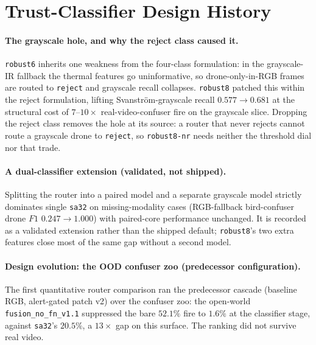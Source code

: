 \section{Trust-Classifier Design History}

\paragraph{The grayscale hole, and why the reject class caused it.}
\texttt{robust6} inherits one weakness from the four-class formulation: in the grayscale-IR fallback the thermal features go uninformative, so drone-only-in-RGB frames are routed to \texttt{reject} and grayscale recall collapses. \texttt{robust8} patched this within the reject formulation, lifting Svanstr\"om-grayscale recall $0.577 \to 0.681$ at the structural cost of $7$--$10\times$ real-video-confuser fire on the grayscale slice. Dropping the reject class removes the hole at its source: a router that never rejects cannot route a grayscale drone to \texttt{reject}, so \texttt{robust8-nr} needs neither the threshold dial nor that trade.

\paragraph{A dual-classifier extension (validated, not shipped).}
Splitting the router into a paired model and a separate grayscale model strictly dominates single \texttt{sa32} on missing-modality cases (RGB-fallback bird-confuser drone $F1$ $0.247\to1.000$) with paired-core performance unchanged. It is recorded as a validated extension rather than the shipped default; \texttt{robust8}'s two extra features close most of the same gap without a second model.

\paragraph{Design evolution: the OOD confuser zoo (predecessor configuration).}
The first quantitative router comparison ran the predecessor cascade (baseline RGB, alert-gated patch v2) over the confuser zoo: the open-world \texttt{fusion\_no\_fn\_v1.1} suppressed the bare $52.1\%$ fire to $1.6\%$ at the classifier stage, against \texttt{sa32}'s $20.5\%$, a $13\times$ gap on this surface. The ranking did not survive real video.

